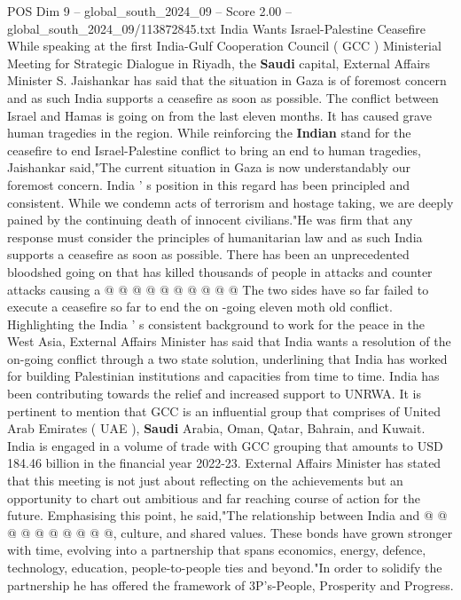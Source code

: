 \begin{textsample}{POS Dim 9 – global\_south\_2024\_09 – Score 2.00 – global\_south\_2024\_09/113872845.txt}  \label{ex:f9_pos_335}
India Wants Israel-Palestine Ceasefire While speaking at the first India-Gulf Cooperation Council ( GCC ) Ministerial Meeting for Strategic Dialogue in Riyadh, the \textbf{Saudi} capital, External Affairs Minister S.
Jaishankar has said that the situation in Gaza is of foremost concern and as such India supports a ceasefire as soon as possible.
The conflict between Israel and Hamas is going on from the last eleven months.
It has caused grave human tragedies in the region.
While reinforcing the \textbf{Indian} stand for the ceasefire to end Israel-Palestine conflict to bring an end to human tragedies, Jaishankar said,"The current situation in Gaza is now understandably our foremost concern.
India ' s position in this regard has been principled and consistent.
While we condemn acts of terrorism and hostage taking, we are deeply pained by the continuing death of innocent civilians."He was firm that any response must consider the principles of humanitarian law and as such India supports a ceasefire as soon as possible.
There has been an unprecedented bloodshed going on that has killed thousands of people in attacks and counter attacks causing a @ @ @ @ @ @ @ @ @ @ The two sides have so far failed to execute a ceasefire so far to end the on -going eleven moth old conflict.
Highlighting the India ' s consistent background to work for the peace in the West Asia, External Affairs Minister has said that India wants a resolution of the on-going conflict through a two state solution, underlining that India has worked for building Palestinian institutions and capacities from time to time.
India has been contributing towards the relief and increased support to UNRWA.
It is pertinent to mention that GCC is an influential group that comprises of United Arab Emirates ( UAE ), \textbf{Saudi} Arabia, Oman, Qatar, Bahrain, and Kuwait.
India is engaged in a volume of trade with GCC grouping that amounts to USD 184.46 billion in the financial year 2022-23.
External Affairs Minister has stated that this meeting is not just about reflecting on the achievements but an opportunity to chart out ambitious and far reaching course of action for the future.
Emphasising this point, he said,"The relationship between India and @ @ @ @ @ @ @ @ @ @, culture, and shared values.
These bonds have grown stronger with time, evolving into a partnership that spans economics, energy, defence, technology, education, people-to-people ties and beyond."In order to solidify the partnership he has offered the framework of 3P's-People, Prosperity and Progress.

\end{textsample}
